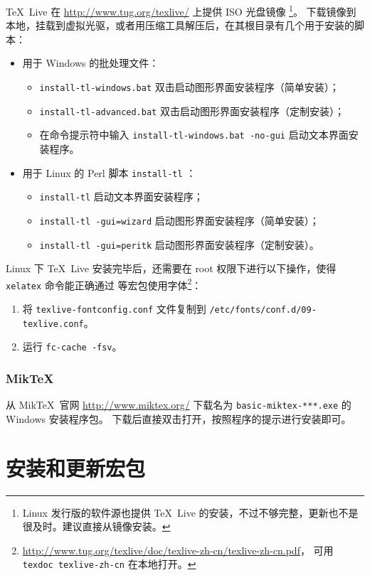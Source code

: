\TeX\ Live 在 \url{http://www.tug.org/texlive/} 上提供 ISO 光盘镜像%
\footnote{Linux 发行版的软件源也提供 \TeX\ Live 的安装，不过不够完整，更新也不是很及时。建议直接从镜像安装。}。
下载镜像到本地，挂载到虚拟光驱，或者用压缩工具解压后，在其根目录有几个用于安装的脚本：
\begin{itemize}
  \item 用于 Windows 的批处理文件：
  \begin{itemize}
    \item \texttt{install-tl-windows.bat} 双击启动图形界面安装程序（简单安装）；
    \item \texttt{install-tl-advanced.bat} 双击启动图形界面安装程序（定制安装）；
    \item 在命令提示符中输入 \texttt{install-tl-windows.bat -no-gui} 启动文本界面安装程序。
  \end{itemize}
  \item 用于 Linux 的 Perl 脚本 \texttt{install-tl} ：
  \begin{itemize}
    \item \texttt{install-tl} 启动文本界面安装程序；
    \item \texttt{install-tl -gui=wizard} 启动图形界面安装程序（简单安装）；
    \item \texttt{install-tl -gui=peritk} 启动图形界面安装程序（定制安装）。
  \end{itemize}
\end{itemize}

Linux 下 \TeX\ Live 安装完毕后，还需要在 root 权限下进行以下操作，使得 \texttt{xelatex} 命令能正确通过 
等宏包使用字体\footnote{\url{http://www.tug.org/texlive/doc/texlive-zh-cn/texlive-zh-cn.pdf}，%
可用 \texttt{texdoc texlive-zh-cn} 在本地打开。}：
\begin{enumerate}
  \item 将 \texttt{texlive-fontconfig.conf} 文件复制到 \texttt{/etc/fonts/conf.d/09-texlive.conf}。
  \item 运行 \texttt{fc-cache -fsv}。
\end{enumerate}

\subsubsection{Mik\TeX}
从 Mik\TeX\ 官网 \url{http://www.miktex.org/} 下载名为 \texttt{basic-miktex-***.exe} 的 Windows 安装程序包。
下载后直接双击打开，按照程序的提示进行安装即可。

\section{安装和更新宏包}\label{sec:pkg-manager}

